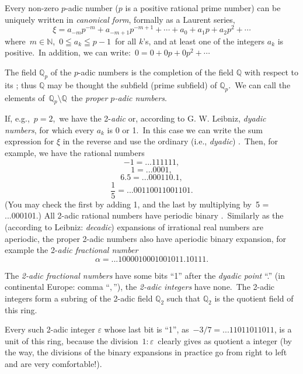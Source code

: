 \documentclass[12pt]{article}
\begin{document}
Every non-zero $p$-adic number ($p$ is a positive rational prime number) can be uniquely written in {\em canonical form}, formally as a Laurent series, 
    $$\xi = a_{-m}p^{-m}+a_{-m+1}p^{-m+1}+\cdots+a_0+a_1p+a_2p^2+\cdots$$
where\, $m \in \mathbb{N}$,\, $0 \leqq a_k \leqq p-1$\, for all $k$'s, and at least one of the integers $a_k$ is positive.\, In addition, we can write:\, 
$0 = 0+0p+0p^2+\cdots$

The field $\mathbb {Q}_p$ of the $p$-adic numbers is the completion of the field $\mathbb {Q}$ with respect to its ; thus $\mathbb {Q}$ may be thought the subfield (prime subfield) of $\mathbb {Q}_p$.\, We can call the elements of\, $\mathbb{Q}_p\!\setminus\!\mathbb{Q}$\, the {\em proper $p$-adic numbers}.

If, e.g.,\, $p = 2$,\, we have the 2-{\em adic} or, according to G. W. Leibniz, {\em dyadic numbers}, for which every $a_k$ is 0 or 1.\, In this case we can write the sum expression for $\xi$ in the reverse  and use the ordinary   (i.e., {\em dyadic}) .\, Then, for example, we have the rational numbers
   $$-1 = ...111111,$$
   $$1 = ...0001,$$ 
   $$6.5 = ...000110.1,$$
   $$\frac{1}{5}= ...00110011001101.$$
(You may check the first by adding 1, and the last by multiplying by\, 5 = ...000101.) 
All 2-adic rational numbers have periodic binary .\, Similarly as the  (according to Leibniz: {\em decadic}) expansions of irrational real numbers are aperiodic, the proper 2-adic numbers also have aperiodic binary expansion, for example the 2-{\em adic fractional number}
   $$\alpha = ...1000010001001011.10111.$$

The {\em 2-adic fractional numbers} have some bits ``1'' after the {\em dyadic point} ``.'' (in continental Europe: comma ``$,$''), the {\em 2-adic integers} have none.\, The 2-adic integers form a subring of the 2-adic field $\mathbb {Q}_2$ such that $\mathbb{Q}_2$ is the quotient field of this ring.

Every such 2-adic integer $\varepsilon$ whose last bit is ``1'', as\, $-3/7 = ...11011011011$, is a unit of this ring, because the division\, $1\colon\!\varepsilon$\, clearly gives as quotient a  integer (by the way, the divisions of the binary expansions in practice go from right to left and are very comfortable!). 
\end{document}
